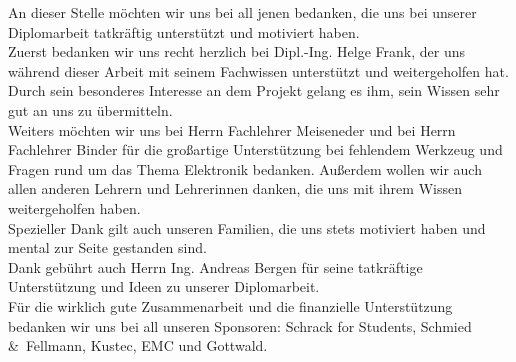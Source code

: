 
\begin{Danksagung}
An dieser Stelle möchten wir uns bei all jenen bedanken, die uns bei unserer Diplomarbeit tatkräftig unterstützt und motiviert haben. \\

Zuerst bedanken wir uns recht herzlich bei Dipl.-Ing. Helge Frank, der uns während dieser Arbeit mit seinem Fachwissen unterstützt und weitergeholfen hat. 
Durch sein besonderes Interesse an dem Projekt gelang es ihm, sein Wissen sehr gut an uns zu übermitteln. \\

Weiters möchten wir uns bei Herrn Fachlehrer Meiseneder und bei Herrn Fachlehrer Binder für die großartige Unterstützung bei fehlendem Werkzeug und Fragen 
rund um das Thema Elektronik bedanken. Außerdem wollen wir auch allen anderen Lehrern und Lehrerinnen danken, die uns mit ihrem Wissen weitergeholfen haben. \\

Spezieller Dank gilt auch unseren Familien, die uns stets motiviert haben und mental zur Seite gestanden sind. \\

Dank gebührt auch Herrn Ing. Andreas Bergen für seine tatkräftige Unterstützung und Ideen zu unserer Diplomarbeit. \\

Für die wirklich gute Zusammenarbeit und die finanzielle Unterstützung bedanken wir uns bei all unseren Sponsoren: Schrack for Students, Schmied \&\ Fellmann, Kustec, EMC und Gottwald.\\
\end{Danksagung}
\newpage

